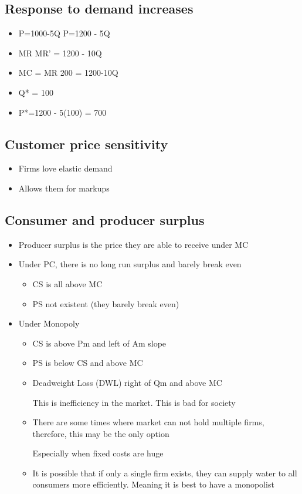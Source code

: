 \documentclass{article}
\begin{document}
\subsection{Response to demand increases}
\begin{itemize}
  \item P=1000-5Q \rightarrow{} P=1200 - 5Q
  \item MR \rightarrow{} MR' = 1200 - 10Q
  \item MC = MR \rightarrow{} 200 = 1200-10Q
  \item Q* = 100
  \item P*=1200 - 5(100) = 700
\end{itemize}

\subsection{Customer price sensitivity}
\begin{itemize}
  \item Firms love elastic demand
  \item Allows them for markups
\end{itemize}

\subsection{Consumer and producer surplus}
\begin{itemize}
  \item Producer surplus is the price they are able to receive under MC
  \item Under PC, there is no long run surplus and barely break even
    \begin{itemize}
      \item CS is all above MC
      \item PS not existent (they barely break even)
    \end{itemize}
  \item Under Monopoly
    \begin{itemize}
      \item CS is above Pm and left of Am slope
      \item PS is below CS and above MC
      \item Deadweight Loss (DWL) right of Qm and above MC

        This is inefficiency in the market. This is bad for society
      \item There are some times where market can not hold multiple firms,
        therefore, this may be the only option

        Especially when fixed costs are huge
      \item It is possible that if only a single firm exists, they can supply
        water to all consumers more efficiently. Meaning it is best to have
        a monopolist
    \end{itemize}
\end{itemize}
\end{document}
